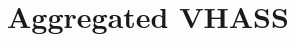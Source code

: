 \chapter{Aggregated VHASS}
\label{appendix:range}
\begin{comment}
Let $x=\sum_{j=0}^{l-1} x_j u^j$, where $x_j$ is an integer and $x_j\in[0,u)$, $u,l$ are integers and $j\in[0,l-1] (=\mathds{Z}_l)$. Then it holds that $x\in[0,u^l)$.
\begin{align*}
x =& \sum_{j=0}^{l-1} x_j u^j \leq \sum_{j=0}^{l-1}  (u-1)u^j = \sum_{j=0}^{l-1} u^{j+1} - \sum_{j=0}^{l-1} u^j = (u-1) \sum_{j=0}^{l-1} u^j =\\
 &(u-1) \frac{u^l-1}{u-1} = u^l-1< u^l 
\end{align*}
Hence the  statement is proved and it is trivial to see that if $j\in[0,l]$ the value of $x$ could exceed $u^l$.
\end{comment}
